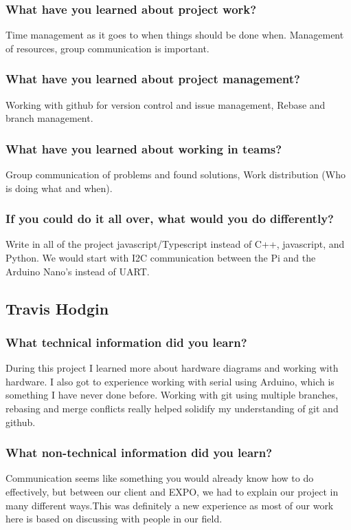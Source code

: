 \documentclass[onecolumn, draftclsnofoot,10pt, compsoc]{IEEEtran}
\begin{document}
			\subsubsection{What have you learned about project work?}
			Time management as it goes to when things should be done when. Management of resources, group communication is important.
			\subsubsection{What have you learned about project management?}
			Working with github for version control and issue management, Rebase and branch management.
			\subsubsection{What have you learned about working in teams?}
			Group communication of problems and found solutions, Work distribution (Who is doing what and when).
			\subsubsection{If you could do it all over, what would you do differently?}
			Write in all of the project  javascript/Typescript instead of C++, javascript, and Python. We would start with I2C communication between the Pi and the  Arduino Nano's instead of UART.
		\subsection{Travis Hodgin}
			\subsubsection{What technical information did you learn?}
			\noindent During this project I learned more about hardware diagrams and working with hardware.
			I also got to experience working with serial using Arduino, which is something I have never
			done before. Working with git using multiple branches, rebasing and merge conflicts really helped
			solidify my understanding of git and github.

			\subsubsection{What non-technical information did you learn?}
			\noindent Communication seems like something you would already know how to do effectively, but between our client and EXPO,
			 we had to explain our project in many different ways.This was definitely a new experience as most of our work here is
			 based on discussing with people in our field.
\end{document}
